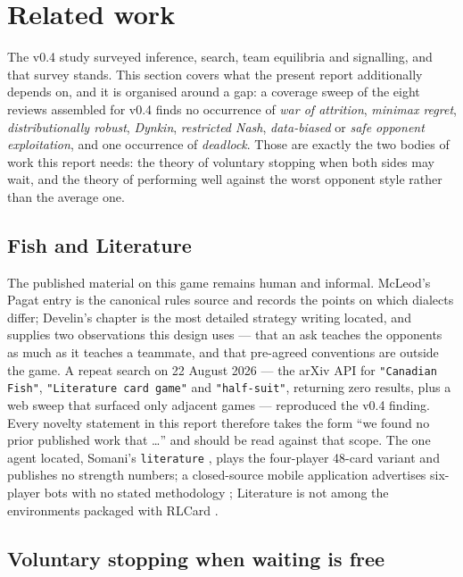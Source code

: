 \documentclass[11pt]{article}
\theoremstyle{definition}
\begin{document}
\section{Related work}
\label{sec:related}

The v0.4 study surveyed inference, search, team equilibria and signalling, and
that survey stands. This section covers what the present report additionally
depends on, and it is organised around a gap: a coverage sweep of the eight
reviews assembled for v0.4 finds no occurrence of \emph{war of attrition},
\emph{minimax regret}, \emph{distributionally robust}, \emph{Dynkin},
\emph{restricted Nash}, \emph{data-biased} or \emph{safe opponent exploitation},
and one occurrence of \emph{deadlock}. Those are exactly the two bodies of work
this report needs: the theory of voluntary stopping when both sides may wait, and
the theory of performing well against the worst opponent style rather than the
average one.

\subsection{Fish and Literature}

The published material on this game remains human and informal. McLeod's Pagat
entry \cite{pagat} is the canonical rules source and records the points on which
dialects differ; Develin's chapter \cite{develin} is the most detailed strategy
writing located, and supplies two observations this design uses --- that an ask
teaches the opponents as much as it teaches a teammate, and that pre-agreed
conventions are outside the game. A repeat search on 22 August 2026 --- the arXiv
API for \texttt{"Canadian Fish"}, \texttt{"Literature card game"} and
\texttt{"half-suit"}, returning zero results, plus a web sweep that surfaced only
adjacent games --- reproduced the v0.4 finding. Every novelty statement in this
report therefore takes the form ``we found no prior published work that \dots''
and should be read against that scope. The one agent located, Somani's
\texttt{literature} \cite{somani}, plays the four-player 48-card variant and
publishes no strength numbers; a closed-source mobile application advertises
six-player bots with no stated methodology \cite{playstore}; Literature is not
among the environments packaged with RLCard \cite{rlcard}.

\subsection{Voluntary stopping when waiting is free}
\label{sec:related-stopping}
\end{document}
